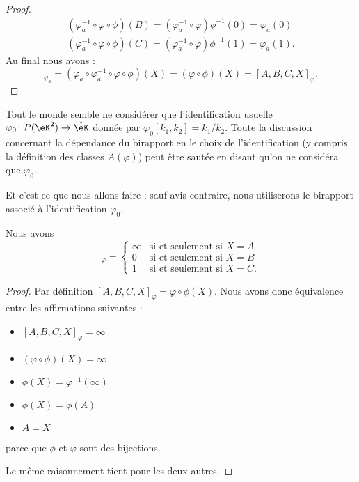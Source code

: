 \begin{proof}
\begin{subequations}
\begin{align}
            (\varphi_a^{-1}\circ\varphi\circ\phi)(B)=(\varphi_a^{-1}\circ\varphi)\phi^{-1}(0)=\varphi_a(0)\\
            (\varphi_a^{-1}\circ\varphi\circ\phi)(C)=(\varphi_a^{-1}\circ\varphi)\phi^{-1}(1)=\varphi_a(1).
        \end{align}
    \end{subequations}
    Au final nous avons :
    \begin{equation}
        [A,B,C,X]_{\varphi_a}=(\varphi_a\circ\varphi_a^{-1}\circ\varphi\circ\phi)(X)=(\varphi\circ\phi)(X)=[A,B,C,X]_{\varphi}.
    \end{equation}
\end{proof}

\begin{remark}
    Tout le monde semble ne considérer que l'identification usuelle \( \varphi_0\colon P(\eK^2)\to \hat\eK\) donnée par \( \varphi_0[k_1,k_2]=k_1/k_2\). Toute la discussion concernant la dépendance du birapport en le choix de l'identification (y compris la définition des classes \( A(\varphi)\)) peut être sautée en disant qu'on ne considéra que \( \varphi_0\).

    Et c'est ce que nous allons faire : sauf avis contraire, nous utiliserons le birapport associé à l'identification \( \varphi_0\).
\end{remark}

\begin{lemma}        \label{LEMooCOFTooVGKdVO}
    Nous avons
    \begin{equation}
        [A,B,C,X]_{\varphi}=\begin{cases}
            \infty    &   \text{si et seulement si } X=A\\
            0    &    \text{si et seulement si }X=B\\
            1    &    \text{si et seulement si }X=C.
        \end{cases}
    \end{equation}
\end{lemma}

\begin{proof}
    Par définition \( [A,B,C,X]_{\varphi}=\varphi\circ\phi(X)\). Nous avons donc équivalence entre les affirmations suivantes :
    \begin{itemize}
        \item \( [A,B,C,X]_{\varphi}=\infty\)
        \item \( (\varphi\circ\phi)(X)=\infty\)
        \item \( \phi(X)=\varphi^{-1}(\infty)\)
        \item \( \phi(X)=\phi(A)\)
        \item \( A=X\)
    \end{itemize}
    parce que \( \phi\) et \( \varphi\) sont des bijections.
    
    Le même raisonnement tient pour les deux autres.
\end{proof}

